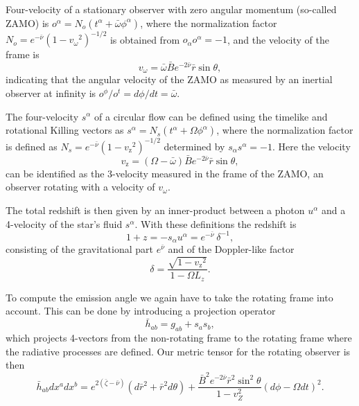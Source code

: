 \documentclass{aa}
\newcommand{\be}{\begin{equation}}
\newcommand{\ee}{\end{equation}}
\newcommand{\refe}[1]{#1}
\newcommand{\rb}{\ensuremath{\bar{r}}}
\newcommand{\wb}{\ensuremath{\bar{\omega}}}
\newcommand{\nub}{\ensuremath{\bar{\nu}}}
\newcommand{\zetab}{\ensuremath{\bar{\zeta}}}
\newcommand{\Bb}{\ensuremath{\bar{B}}}
\newcommand{\vw}{\ensuremath{v_{\omega}}}
\newcommand{\vz}{\ensuremath{v_{\mathrm{z}}}}
\begin{document}
Four-velocity of a stationary observer \refe{with zero angular momentum (so-called ZAMO)} is $o^{\alpha} = N_o (t^{\alpha} + \wb \phi^{\alpha})$, where the normalization factor $N_o = e^{-\nub}(1-\vw^2)^{-1/2}$ is obtained from $o_{\alpha}o^{\alpha} = -1$, and the velocity of the frame is 
\be
\vw = \wb \Bb e^{-2\nub} \rb \sin\theta,
\ee
indicating that the angular velocity \refe{of the ZAMO} as measured by an inertial observer at infinity is $o^{\phi} / o^{t} = d\phi/dt = \wb$.

\refe{The four-velocity $s^{\alpha}$ of} a circular flow can be defined using the timelike and rotational Killing vectors as $s^{\alpha} = N_s (t^{\alpha} + \Omega \phi^{\alpha})$, where the normalization factor is defined as $N_s = e^{-\nub} (1 - \vz^2)^{-1/2}$ determined by $s_{\alpha}s^{\alpha} = -1$.
Here the velocity 
\be
\vz = (\Omega - \wb) \Bb e^{-2\nub} \rb \sin\theta,
\ee
can be identified as the 3-velocity measured in the frame of the \refe{ZAMO}, an observer rotating with a velocity of $\vw$.

The total redshift is then given by an inner-product between a photon $u^{\alpha}$ and a 4-velocity of the star's fluid $s^{\alpha}$.
With these definitions the redshift is
\be\label{eq:redshift}
1 + z = -s_{\alpha} u^{\alpha} = e^{-\nub} ~\delta^{-1},
\ee
consisting of the gravitational part $e^{\nub}$ and of the Doppler-like \refe{factor}
\be
\delta = \frac{\sqrt{1-\vz^2}}{1 - \Omega L_z}.
\ee

To compute the emission angle we again have to take the rotating frame into account.  
This can be done by introducing a projection operator 
\be
\bar{h}_{ab} = g_{ab} + s_a s_b, 
\ee
which projects 4-vectors from the non-rotating frame to the rotating frame where the radiative processes are defined.  
\refe{Our metric tensor for the rotating observer is then}
\be\label{eq:proj}
\bar{h}_{ab} dx^a dx^b = e^{2(\zetab - \nub)} (d\rb^2 + \rb^2 d\theta) + \frac{\Bb^2 e^{-2\nub} \rb^2 \sin^2\theta}{1-v_Z^2} (d\phi - \Omega dt)^2.
\ee
\end{document}
